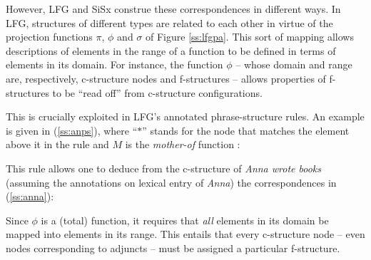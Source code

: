 \documentclass[output=paper,hidelinks]{langscibook}
\begin{document}
However, LFG and SiSx construe these correspondences in different ways. In LFG, structures of different types are related to each other in virtue of the projection functions $\pi$, $\phi$ and $\sigma$ of Figure \ref{ss:lfgpa}. This sort of mapping allows descriptions of elements in the range of a function to be defined in terms of elements in its domain. For instance, the function $\phi$ -- whose domain and range are, respectively, c-structure nodes and f-structures -- allows properties of f-structures to be ``read off'' from c-structure configurations.


This is crucially exploited in LFG's annotated phrase-structure rules. An example is given in (\ref{ss:anps}), where ``$*$'' stands for the node that matches the element above it in the rule and $M$ is the \textit{mother-of} function \citep[18]{kaplan1995formal}:%



This rule allows one to deduce from the c-structure of \textit{Anna wrote books} (assuming the annotations on lexical entry of \textit{Anna}) the correspondences in (\ref{ss:anna}):



Since $\phi$ is a (total) function, it requires that \textit{all} elements in its domain be mapped into elements in its range. This entails that every c-structure node -- even nodes corresponding to adjuncts -- must be assigned a particular f-structure.
\end{document}
